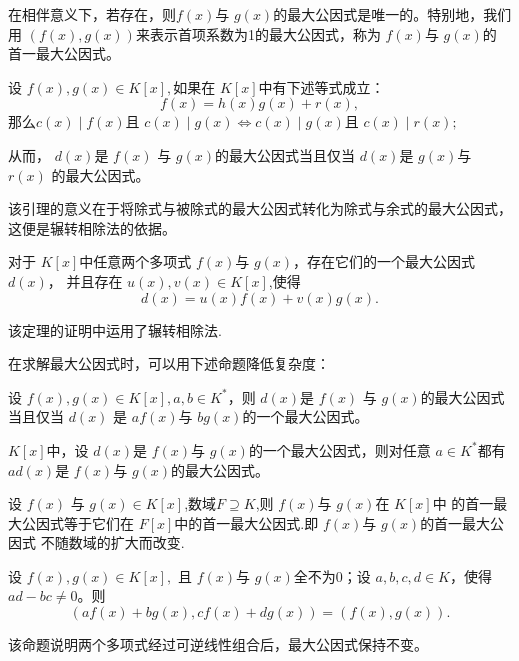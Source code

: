 在相伴意义下，若存在，则$f(x)$与 $g(x)$的最大公因式是唯一的。特别地，我们用 $(f(x),g(x))$来表示首项系数为1的最大公因式，称为 $f(x)$与 $g(x)$的
首一最大公因式。
\begin{mylmm}
    设 $f(x),g(x)\in K[x],$如果在 $K[x]$中有下述等式成立：
    \[f(x)=h(x)g(x)+r(x),\]
    那么\quad $c(x)\mid f(x)$且 $c(x)\mid g(x)\Leftrightarrow c(x)\mid g(x)$且 $c(x)\mid r(x);$

    从而， $d(x)$是 $f(x)$ 与 $g(x)$的最大公因式当且仅当 $d(x)$是 $g(x)$与 $r(x)$ 的最大公因式。
\end{mylmm}
\begin{myrmk}
    该引理的意义在于将除式与被除式的最大公因式转化为除式与余式的最大公因式，这便是辗转相除法的依据。
\end{myrmk}
\begin{mythm}
    对于 $K[x]$中任意两个多项式 $f(x)$与 $g(x)$，存在它们的一个最大公因式 $d(x)$，
    并且存在 $u(x),v(x)\in K[x]$,使得
    \[d(x)=u(x)f(x)+v(x)g(x).\]
\end{mythm}
\begin{myrmk}
该定理的证明中运用了辗转相除法.
\end{myrmk}
在求解最大公因式时，可以用下述命题降低复杂度：
\begin{myprop}
    设 $f(x),g(x)\in K[x],a,b\in K^*$，则 $d(x)$是 $f(x)$ 与 $g(x)$的最大公因式当且仅当 $d(x)$ 是 $af(x)$与 $bg(x)$的一个最大公因式。
\end{myprop}
\begin{myprop}
    $K[x]$中，设 $d(x)$是 $f(x)$与 $g(x)$的一个最大公因式，则对任意 $a\in K^*$都有 $ad(x)$是 $f(x)$与 $g(x)$的最大公因式。
\end{myprop}
\begin{myprop}
    设 $f(x)$ 与 $g(x)\in K[x]$,数域$F\supseteq K$,则 $f(x)$与 $g(x)$在 $K[x]$中
    的首一最大公因式等于它们在 $F[x]$中的首一最大公因式.即 $f(x)$与 $g(x)$的首一最大公因式
    不随数域的扩大而改变.
\end{myprop}
\begin{myprop}
    设 $f(x),g(x)\in K[x],$ 且 $f(x)$与 $g(x)$全不为0；设 $a,b,c,d\in K$，使得 $ad-bc\neq 0$。则 
    \[(af(x)+bg(x),cf(x)+dg(x))=(f(x),g(x)).\]
\end{myprop}
\begin{myrmk}
    该命题说明两个多项式经过可逆线性组合后，最大公因式保持不变。
\end{myrmk}

